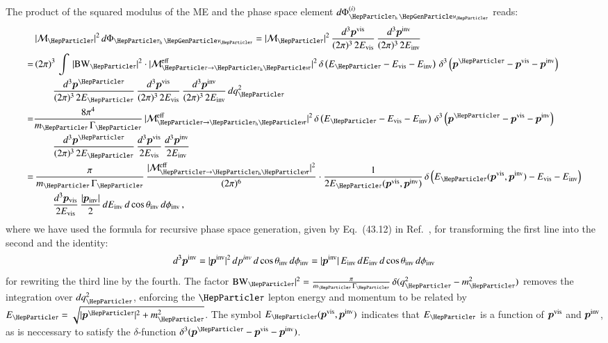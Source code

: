 The product of the squared modulus of the ME and the phase space
element $d\Phi^{(i)}_{\tauhnu}$ reads:
\begin{align}
 & \, \vert\mathcal{M}_{\Pgt}\vert^{2} \,
 d\Phi_{\tauhnu} = \vert\mathcal{M}_{\Pgt}\vert^{2} \, \frac{d^{3}\bm{p}^{\vis}}{(2\pi)^{3} \, 2
   E_{\vis}} \, \frac{d^{3}\bm{p}^{\inv}}{(2\pi)^{3} \, 2 E_{\inv}} \nonumber \\
= & \, (2\pi)^{3} \, \int \, \vert \BW_{\Pgt} \vert^{2} \cdot \vert\mathcal{M}^{\eff}_{\Pgt \to
  \tauh\Pnut}\vert^{2} \, \delta \left( E_{\Pgt} - E_{\vis} -
  E_{\inv} \right) \, \delta^{3} \left( \bm{p}^{\Pgt} - \bm{p}^{\vis}
  - \bm{p}^{\inv} \right) \nonumber \\
& \qquad \frac{d^{3}\bm{p}^{\Pgt}}{(2\pi)^{3} \, 2 E_{\Pgt}} \, 
  \frac{d^{3}\bm{p}^{\vis}}{(2\pi)^{3} \, 2E_{\vis}} \, \frac{d^{3}\bm{p}^{\inv}}{(2\pi)^{3} \, 2 E_{\inv}} \, dq^{2}_{\Pgt} \nonumber \\
= & \frac{8\pi^{4}}{m_{\Pgt} \, \Gamma_{\Pgt}} \, \vert\mathcal{M}^{\eff}_{\Pgt \to
  \tauh\Pnut}\vert^{2} \, \delta \left( E_{\Pgt} - E_{\vis} -
  E_{\inv} \right) \, \delta^{3} \left( \bm{p}^{\Pgt} - \bm{p}^{\vis}
  - \bm{p}^{\inv} \right) \nonumber \\
& \qquad \frac{d^{3}\bm{p}^{\Pgt}}{(2\pi)^{3} \, 2 E_{\Pgt}} \, 
  \frac{d^{3}\bm{p}^{\vis}}{2 E_{\vis}} \, \frac{d^{3}\bm{p}^{\inv}}{2
    E_{\inv}} \nonumber \\
= & \, \frac{\pi}{m_{\Pgt} \, \Gamma_{\Pgt}} \, \frac{\vert\mathcal{M}^{\eff}_{\Pgt \to
  \tauh\Pnut}\vert^{2}}{(2\pi)^{6}} 
 \cdot \frac{1}{2 E_{\Pgt}(\bm{p}^{\vis}, \bm{p}^{\inv})} \, \delta
 \left( E_{\Pgt}(\bm{p}^{\vis}, \bm{p}^{\inv}) - E_{\vis} - E_{\inv}
 \right) \nonumber \\
& \qquad
  \frac{d^{3}\bm{p}_{\vis}}{2 E_{\vis}} \, \frac{\vert\bm{p}_{\inv}\vert}{2} \, dE_{\inv} \, d\cos\theta_{\inv} \, d\phi_{\inv} \, ,
\label{eq:hadTauDecaysPSint}
\end{align}
where we have used the formula for recursive phase space generation,
given by Eq.~(43.12) in Ref.~\cite{PDG}, for transforming the first line into the second
and the identity:
\begin{equation} 
d^{3}\bm{p}^{\textrm{inv}} = \vert\bm{p}^{\textrm{inv}}\vert^{2} \,
dp^{inv} \, d\cos\theta_{\textrm{inv}} \, d\phi_{\textrm{inv}} =
\vert\bm{p}^{\textrm{inv}}\vert \, E_{\textrm{inv}} \, dE_{\textrm{inv}} \, d\cos\theta_{\textrm{inv}}
\, d\phi_{\textrm{inv}}
\end{equation} 
for rewriting the third line by the fourth.
The factor $\BW_{\Pgt} \vert^{2} = \frac{\pi}{m_{\Pgt} \,
  \Gamma_{\Pgt}} \, \delta ( q^{2}_{\Pgt} - m^{2}_{\Pgt} )$ removes
the integration over $dq^{2}_{\Pgt}$, enforcing the $\Pgt$ lepton
energy and momentum to be related by $E_{\Pgt} =
\sqrt{\vert\bm{p}^{\Pgt}\vert^{2} + m_{\Pgt}^{2}}$.
The symbol $E_{\Pgt}(\bm{p}^{\vis}, \bm{p}^{\inv})$
indicates that $E_{\Pgt}$ is a function of $\bm{p}^{\textrm{vis}}$
and $\bm{p}^{\textrm{inv}}$, as is neccessary to satisfy the $
\delta$-function $\delta^{3} ( \bm{p}^{\Pgt} - \bm{p}^{\vis} - \bm{p}^{\inv} )$.


